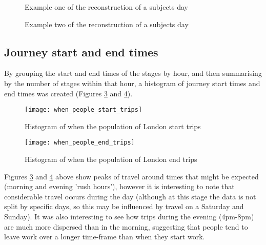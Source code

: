 \begin{landscape}

\begin{figure}[H]
\centering
{}
\caption{Example one of the reconstruction of a subjects day}
\label{fig:routed_results_example}
\end{figure}

\newpage

\begin{figure}[H]
\centering
{}
\caption{Example two of the reconstruction of a subjects day}
\label{fig:routed_results_example2}
\end{figure}

\end{landscape}

\subsection{Journey start and end times}
\label{sec:journey_start_and_end_times}

By grouping the start and end times of the stages by hour, and then summarising by the number of stages within that hour, a histogram of journey start times and end times was created (Figures \ref{fig:when_people_start_trips} and \ref{fig:when_people_end_trips}).

\begin{figure}[H]
\centering
\texttt{[image: when\_people\_start\_trips]}
\caption{Histogram of when the population of London start trips}
\label{fig:when_people_start_trips}
\end{figure}

\begin{figure}[H]
\centering
\texttt{[image: when\_people\_end\_trips]}
\caption{Histogram of when the population of London end trips}
\label{fig:when_people_end_trips}
\end{figure}

Figures \ref{fig:when_people_start_trips} and \ref{fig:when_people_end_trips} above show peaks of travel around times that might be expected (morning and evening 'rush hours'), however it is interesting to note that considerable travel occurs during the day (although at this stage the data is not split by specific days, so this may be influenced by travel on a Saturday and Sunday). It was also interesting to see how trips during the evening (4pm-8pm) are much more dispersed than in the morning, suggesting that people tend to leave work over a longer time-frame than when they start work. 

